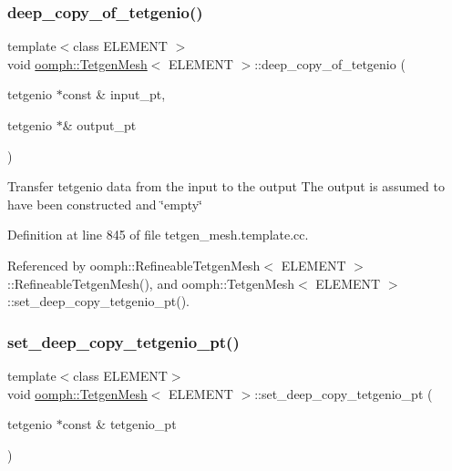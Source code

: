 \subsubsection{\texorpdfstring{deep\+\_\+copy\+\_\+of\+\_\+tetgenio()}{deep\_copy\_of\_tetgenio()}}
{\footnotesize\ttfamily template$<$class E\+L\+E\+M\+E\+NT $>$ \\
void \hyperlink{classoomph_1_1TetgenMesh}{oomph\+::\+Tetgen\+Mesh}$<$ E\+L\+E\+M\+E\+NT $>$\+::deep\+\_\+copy\+\_\+of\+\_\+tetgenio (\begin{DoxyParamCaption}\item[{tetgenio $\ast$const \&}]{input\+\_\+pt,  }\item[{tetgenio $\ast$\&}]{output\+\_\+pt }\end{DoxyParamCaption})}

Transfer tetgenio data from the input to the output The output is assumed to have been constructed and \char`\"{}empty\char`\"{} 

Definition at line 845 of file tetgen\+\_\+mesh.\+template.\+cc.



Referenced by oomph\+::\+Refineable\+Tetgen\+Mesh$<$ E\+L\+E\+M\+E\+N\+T $>$\+::\+Refineable\+Tetgen\+Mesh(), and oomph\+::\+Tetgen\+Mesh$<$ E\+L\+E\+M\+E\+N\+T $>$\+::set\+\_\+deep\+\_\+copy\+\_\+tetgenio\+\_\+pt().

\mbox{\label{classoomph_1_1TetgenMesh_a8758320eb646d20b578414c35145f0d7}} 
\subsubsection{\texorpdfstring{set\+\_\+deep\+\_\+copy\+\_\+tetgenio\+\_\+pt()}{set\_deep\_copy\_tetgenio\_pt()}}
{\footnotesize\ttfamily template$<$class E\+L\+E\+M\+E\+NT$>$ \\
void \hyperlink{classoomph_1_1TetgenMesh}{oomph\+::\+Tetgen\+Mesh}$<$ E\+L\+E\+M\+E\+NT $>$\+::set\+\_\+deep\+\_\+copy\+\_\+tetgenio\+\_\+pt (\begin{DoxyParamCaption}\item[{tetgenio $\ast$const \&}]{tetgenio\+\_\+pt }\end{DoxyParamCaption})\hspace{0.3cm}{\ttfamily [inline]}}



